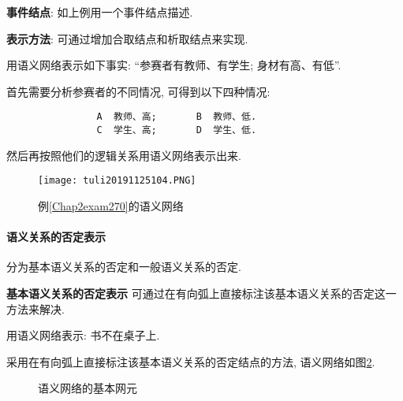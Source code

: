 \textbf{事件结点}: 如上例用一个事件结点描述.

\textbf{表示方法}: 可通过增加合取结点和析取结点来实现.
\begin{example}\label{Chap2exam270}
用语义网络表示如下事实: “参赛者有教师、有学生; 身材有高、有低”.
\end{example}
首先需要分析参赛者的不同情况, 可得到以下四种情况:
\begin{center}
\begin{Verbatim}
                A  教师、高;       B  教师、低.
                C  学生、高;       D  学生、低.
\end{Verbatim}
\end{center}
然后再按照他们的逻辑关系用语义网络表示出来.
\begin{figure}[H]
\centering
\texttt{[image: tuli20191125104.PNG]}
\caption{例\ref{Chap2exam270}的语义网络}
\label{AI32fig104}
\end{figure}
\paragraph{语义关系的否定表示}
    分为基本语义关系的否定和一般语义关系的否定.

 \textbf{基本语义关系的否定表示} 可通过在有向弧上直接标注该基本语义关系的否定这一方法来解决.

\begin{example}
用语义网络表示: 书不在桌子上.
\end{example}
采用在有向弧上直接标注该基本语义关系的否定结点的方法, 语义网络如图\ref{AI32fig00105}.
\begin{figure}[H]
\begin{center}
\caption{语义网络的基本网元}
\label{AI32fig00105}
\end{center}
\end{figure}

